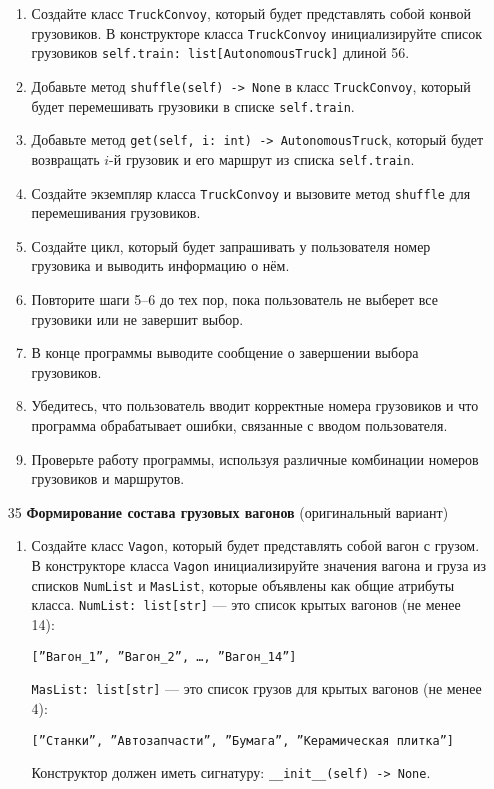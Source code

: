 \begin{enumerate}
\begin{enumerate}
    \item Создайте класс \texttt{TruckConvoy}, который будет представлять собой конвой грузовиков. В конструкторе класса \texttt{TruckConvoy} инициализируйте список грузовиков \texttt{self.train: list[AutonomousTruck]} длиной 56.

    \item Добавьте метод \texttt{shuffle(self) -> None} в класс \texttt{TruckConvoy}, который будет перемешивать грузовики в списке \texttt{self.train}.

    \item Добавьте метод \texttt{get(self, i: int) -> AutonomousTruck}, который будет возвращать $i$-й грузовик и его маршрут из списка \texttt{self.train}.

    \item Создайте экземпляр класса \texttt{TruckConvoy} и вызовите метод \texttt{shuffle} для перемешивания грузовиков.

    \item Создайте цикл, который будет запрашивать у пользователя номер грузовика и выводить информацию о нём.

    \item Повторите шаги 5–6 до тех пор, пока пользователь не выберет все грузовики или не завершит выбор.

    \item В конце программы выводите сообщение о завершении выбора грузовиков.

    \item Убедитесь, что пользователь вводит корректные номера грузовиков и что программа обрабатывает ошибки, связанные с вводом пользователя.

    \item Проверьте работу программы, используя различные комбинации номеров грузовиков и маршрутов.
\end{enumerate}

\item[35] \textbf{Формирование состава грузовых вагонов} (оригинальный вариант)
\begin{enumerate}
    \item Создайте класс \texttt{Vagon}, который будет представлять собой вагон с грузом. В конструкторе класса \texttt{Vagon} инициализируйте значения вагона и груза из списков \texttt{NumList} и \texttt{MasList}, которые объявлены как общие атрибуты класса. \texttt{NumList: list[str]} — это список крытых вагонов (не менее 14): 
    \begin{center}
        \texttt{[''Вагон\_1'', ''Вагон\_2'', \dots, ''Вагон\_14'']}
    \end{center}
    \texttt{MasList: list[str]} — это список грузов для крытых вагонов (не менее 4):
    \begin{center}
        \texttt{[''Станки'', ''Автозапчасти'', ''Бумага'', ''Керамическая плитка'']}
    \end{center}
    Конструктор должен иметь сигнатуру: \texttt{\_\_init\_\_(self) -> None}.


\end{enumerate}
\end{enumerate}
